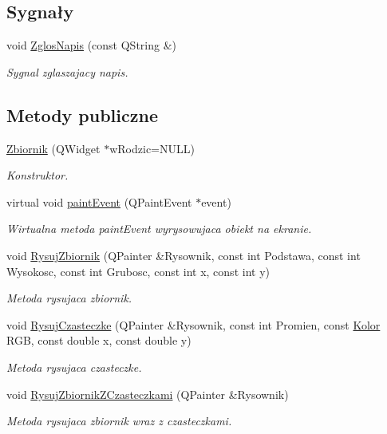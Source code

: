 \subsection*{Sygnały}
\begin{DoxyCompactItemize}
\item 
void \hyperlink{class_zbiornik_a2d92e4a46f9a5dda37ddd9948046580b}{Zglos\-Napis} (const Q\-String \&)
\begin{DoxyCompactList}\small\item\em Sygnal zglaszajacy napis. \end{DoxyCompactList}\end{DoxyCompactItemize}
\subsection*{Metody publiczne}
\begin{DoxyCompactItemize}
\item 
\hyperlink{class_zbiornik_a52fb780bf924b89018348be8a65eaf68}{Zbiornik} (Q\-Widget $\ast$w\-Rodzic=N\-U\-L\-L)
\begin{DoxyCompactList}\small\item\em Konstruktor. \end{DoxyCompactList}\item 
virtual void \hyperlink{class_zbiornik_af7a9c185e95b92de342c6dc69f020765}{paint\-Event} (Q\-Paint\-Event $\ast$event)
\begin{DoxyCompactList}\small\item\em Wirtualna metoda paint\-Event wyrysowujaca obiekt na ekranie. \end{DoxyCompactList}\item 
void \hyperlink{class_zbiornik_ad15f40d418d9ebf261de0eabe8cc2906}{Rysuj\-Zbiornik} (Q\-Painter \&Rysownik, const int Podstawa, const int Wysokosc, const int Grubosc, const int x, const int y)
\begin{DoxyCompactList}\small\item\em Metoda rysujaca zbiornik. \end{DoxyCompactList}\item 
void \hyperlink{class_zbiornik_ad93223745351d4d18f64c5c43dfc5fdc}{Rysuj\-Czasteczke} (Q\-Painter \&Rysownik, const int Promien, const \hyperlink{class_kolor}{Kolor} R\-G\-B, const double x, const double y)
\begin{DoxyCompactList}\small\item\em Metoda rysujaca czasteczke. \end{DoxyCompactList}\item 
void \hyperlink{class_zbiornik_af831a2751191eab54fb6438392ac6edb}{Rysuj\-Zbiornik\-Z\-Czasteczkami} (Q\-Painter \&Rysownik)
\begin{DoxyCompactList}\small\item\em Metoda rysujaca zbiornik wraz z czasteczkami. \end{DoxyCompactList}\end{DoxyCompactItemize}
